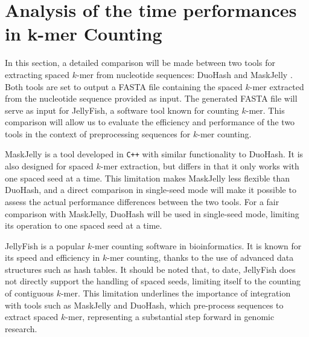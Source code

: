 \section[Analysis of the time performances in $k$-mer Counting]{Analysis of the time performances in k-mer Counting}
\label{sec:kmer-counting}

In this section, a detailed comparison will be made between two tools for extracting spaced $k$-mer from nucleotide sequences: DuoHash and MaskJelly \cite{ebler2022pangenome}. Both tools are set to output a FASTA file containing the spaced $k$-mer extracted from the nucleotide sequence provided as input. The generated FASTA file will serve as input for JellyFish, a software tool known for counting $k$-mer. This comparison will allow us to evaluate the efficiency and performance of the two tools in the context of preprocessing sequences for $k$-mer counting.

MaskJelly is a tool developed in \verb|C++| with similar functionality to DuoHash. It is also designed for spaced $k$-mer extraction, but differs in that it only works with one spaced seed at a time. This limitation makes MaskJelly less flexible than DuoHash, and a direct comparison in single-seed mode will make it possible to assess the actual performance differences between the two tools. For a fair comparison with MaskJelly, DuoHash will be used in single-seed mode, limiting its operation to one spaced seed at a time.

JellyFish is a popular $k$-mer counting software in bioinformatics. It is known for its speed and efficiency in $k$-mer counting, thanks to the use of advanced data structures such as hash tables. It should be noted that, to date, JellyFish does not directly support the handling of spaced seeds, limiting itself to the counting of contiguous $k$-mer. This limitation underlines the importance of integration with tools such as MaskJelly and DuoHash, which pre-process sequences to extract spaced $k$-mer, representing a substantial step forward in genomic research.

